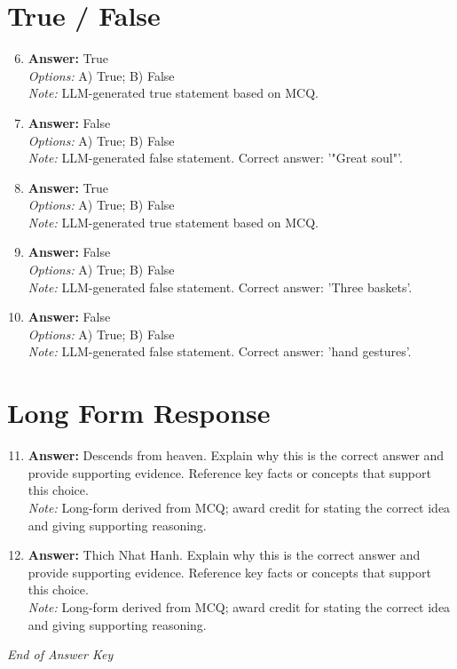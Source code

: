 \documentclass[12pt]{article}
\begin{document}
\section*{True / False}
\begin{enumerate}[label=\arabic*.]
\setcounter{enumi}{5}
\item \textbf{Answer:} True
\\ \textit{Options:} A) True; B) False
\\ \textit{Note:} LLM-generated true statement based on MCQ.
\item \textbf{Answer:} False
\\ \textit{Options:} A) True; B) False
\\ \textit{Note:} LLM-generated false statement. Correct answer: '"Great soul"'.
\item \textbf{Answer:} True
\\ \textit{Options:} A) True; B) False
\\ \textit{Note:} LLM-generated true statement based on MCQ.
\item \textbf{Answer:} False
\\ \textit{Options:} A) True; B) False
\\ \textit{Note:} LLM-generated false statement. Correct answer: 'Three baskets'.
\item \textbf{Answer:} False
\\ \textit{Options:} A) True; B) False
\\ \textit{Note:} LLM-generated false statement. Correct answer: 'hand gestures'.
\end{enumerate}

\section*{Long Form Response}
\begin{enumerate}[label=\arabic*.]
\setcounter{enumi}{10}
\item \textbf{Answer:} Descends from heaven. Explain why this is the correct answer and provide supporting evidence. Reference key facts or concepts that support this choice.
\\ \textit{Note:} Long-form derived from MCQ; award credit for stating the correct idea and giving supporting reasoning.
\item \textbf{Answer:} Thich Nhat Hanh. Explain why this is the correct answer and provide supporting evidence. Reference key facts or concepts that support this choice.
\\ \textit{Note:} Long-form derived from MCQ; award credit for stating the correct idea and giving supporting reasoning.
\end{enumerate}

\vfill
\noindent\textit{End of Answer Key}
\end{document}
